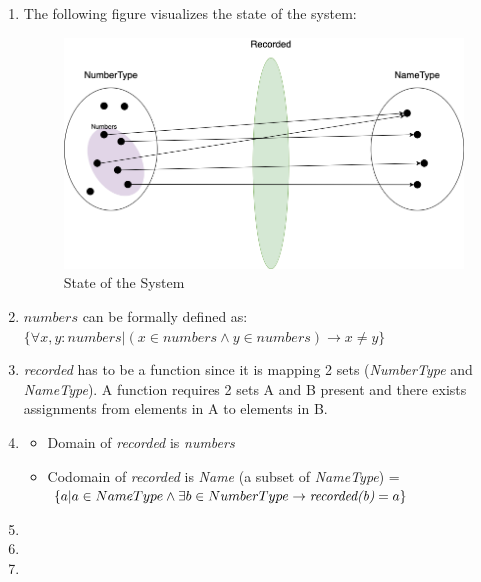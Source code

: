 \begin{enumerate}
    \item The following figure visualizes the state of the system:
        \begin{figure}[h]
        \centering
        \includegraphics[scale=0.45]{images/Diagram.png}
        \caption{State of the System}
        \label{fig:Diagram}
        \end{figure}
    \item $numbers$ can be formally defined as: \\
    $\{ \forall x, y: numbers | (x \in numbers \wedge y \in numbers) \rightarrow x \neq y \}$
\item \emph{recorded} has to be a function since it is mapping 2 sets (\emph{NumberType} and \emph{NameType}). A function requires 2 sets A and B present and there exists assignments from elements in A to elements in B.
\item 
    \begin{itemize}
        \item[] Domain of \emph{recorded} is \emph{numbers}
        \item[] Codomain of \emph{recorded} is \emph{Name} (a subset of \emph{NameType}) = $\{a | a \in NameType \wedge \exists b \in NumberType \rightarrow \text{\emph{recorded(b)}} = a \}$
    \end{itemize}
    \item
    \item
    \item
\end{enumerate}
